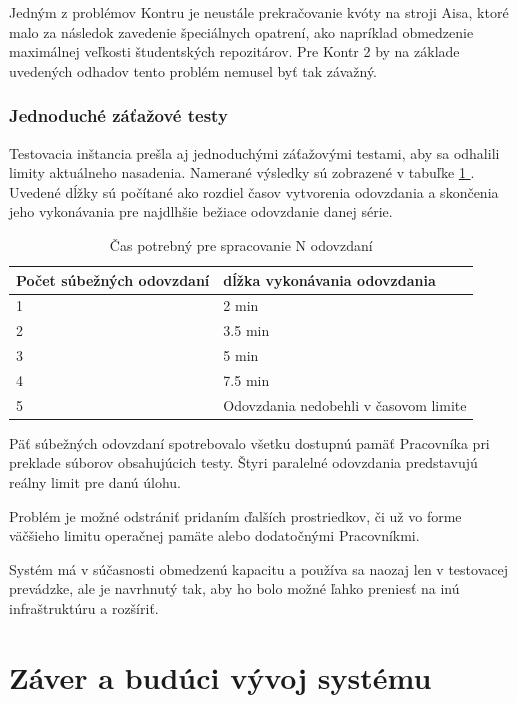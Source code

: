 \documentclass[
  digital, %
  oneside, %
  table,   %
  lof,     %
  lot,   %
]{fithesis3}
\newcommand*{\fullref}[1]{\hyperref[{#1}]{\ref*{#1} \nameref*{#1}}}
\begin{document}
Jedným z problémov Kontru je neustále prekračovanie kvóty na stroji Aisa, ktoré malo za následok zavedenie špeciálnych opatrení, ako napríklad obmedzenie maximálnej veľkosti študentských repozitárov. Pre Kontr 2 by na základe uvedených odhadov tento problém nemusel byť tak závažný.

\subsection{Jednoduché záťažové testy}

Testovacia inštancia prešla aj jednoduchými záťažovými testami, aby sa odhalili limity aktuálneho nasadenia. Namerané výsledky sú zobrazené v tabuľke \fullref{tab:timelimits}.
Uvedené dĺžky sú počítané ako rozdiel časov vytvorenia odovzdania a skončenia jeho vykonávania pre najdlhšie bežiace odovzdanie danej série.

\begin{table}[h]
\begin{tabular}{l l}
Počet súbežných odovzdaní & dĺžka vykonávania odovzdania  \\ [0.5ex] 
\hline
1 &  2 min  \\
2 & 3.5 min  \\
3 & 5 min \\
4 & 7.5 min \\  
5 & Odovzdania nedobehli v časovom limite \\
\end{tabular}
\caption{Čas potrebný pre spracovanie N odovzdaní} \label{tab:timelimits}

\end{table}

Päť súbežných odovzdaní spotrebovalo všetku dostupnú pamäť Pracovníka pri preklade súborov obsahujúcich testy. Štyri paralelné odovzdania predstavujú reálny limit pre danú úlohu. 

Problém je možné odstrániť pridaním ďalších prostriedkov, či už vo forme väčšieho limitu operačnej pamäte alebo dodatočnými Pracovníkmi.

Systém má v súčasnosti obmedzenú kapacitu a používa sa naozaj len v testovacej prevádzke, ale je navrhnutý tak, aby ho bolo možné ľahko preniesť na inú infraštruktúru a rozšíriť.

\chapter{Záver a budúci vývoj systému}
\end{document}
